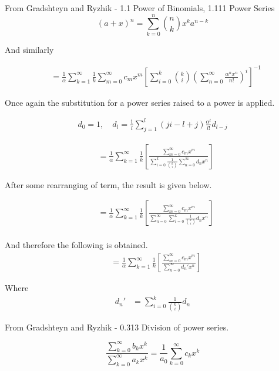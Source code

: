 From Gradshteyn and Ryzhik - 1.1 Power of Binomials, 1.111 Power Series
\begin{equation}
	(a+x)^n = \sum\limits_{k=0}^{n}{n \choose k}x^k a^{n-k}
\end{equation}

And similarly

\begin{align*}
	& = \frac{1}{\alpha}\sum\limits_{k=1}^{\infty}\frac{1}{k}\sum\limits_{m=0}^{\infty}c_mx^m
	\left[ \sum\limits_{i=0}^{k}{k \choose i} \left( \sum\limits_{n=0}^{\infty}\frac{\alpha^nx^n}{n!} \right)^{i} \right]^{-1}
\end{align*}

Once again the substitution for a power series raised to a power is applied.

\begin{align*}
	d_{0} = 1, \quad d_{l}=\frac{1}{l}\sum\limits_{j=1}^{l}(ji-l+j)\frac{\alpha^{l}}{l!}d_{l-j}
\end{align*}

\begin{align*}
	& = \frac{1}{\alpha}\sum\limits_{k=1}^{\infty}\frac{1}{k}\left[ \frac{\sum\limits_{m=0}^{\infty}c_{m}x^{m}}{\sum\limits_{i=0}^{k}\frac{1}{{k \choose i}}\sum\limits_{n=0}^{\infty}d_{n}x^{n}} \right]
\end{align*}

After some rearranging of term, the result is given below.

\begin{align*}
	& = \frac{1}{\alpha}\sum\limits_{k=1}^{\infty}\frac{1}{k}\left[ \frac{\sum\limits_{m=0}^{\infty}c_{m}x^{m}}{\sum\limits_{n=0}^{\infty}\sum\limits_{i=0}^{k}\frac{1}{{k \choose i}}d_{n}x^{n}} \right] \\
\end{align*}

And therefore the following is obtained.
\begin{align*}
	& = \frac{1}{\alpha}\sum\limits_{k=1}^{\infty}\frac{1}{k}\left[ \frac{\sum\limits_{m=0}^{\infty}c_{m}x^{m}}{\sum\limits_{n=0}^{\infty}d_{n}'x^{n}} \right]
\end{align*}

Where
\begin{align*}
 	d_{n}' & = \sum\limits_{i=0}^{k}\frac{1}{{k \choose i}}d_{n}
\end{align*}

From Gradshteyn and Ryzhik - 0.313 Division of power series.

\begin{equation}
	\frac{\sum\limits_{k=0}^{\infty}b_k x^k}{\sum\limits_{k=0}^{\infty}a_k x^k}
	= \frac{1}{a_0}\sum\limits_{k=0}^{\infty}c_kx^k
\end{equation}

